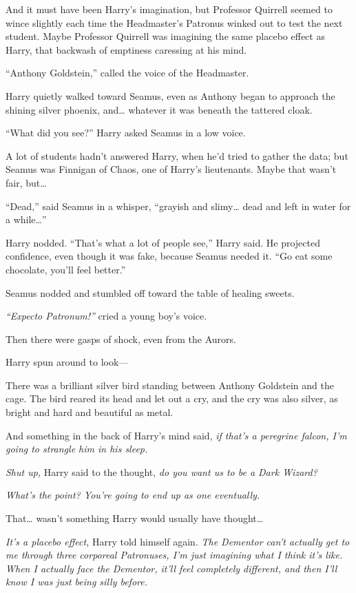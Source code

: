 And it must have been Harry's imagination, but Professor Quirrell seemed
to wince slightly each time the Headmaster's Patronus winked out to test
the next student. Maybe Professor Quirrell was imagining the same
placebo effect as Harry, that backwash of emptiness caressing at his
mind.

``Anthony Goldstein,'' called the voice of the Headmaster.

Harry quietly walked toward Seamus, even as Anthony began to approach
the shining silver phoenix, and\ldots{} whatever it was beneath the
tattered cloak.

``What did you see?'' Harry asked Seamus in a low voice.

A lot of students hadn't answered Harry, when he'd tried to gather the
data; but Seamus was Finnigan of Chaos, one of Harry's lieutenants.
Maybe that wasn't fair, but\ldots{}

``Dead,'' said Seamus in a whisper, ``grayish and slimy\ldots{} dead and
left in water for a while\ldots{}''

Harry nodded. ``That's what a lot of people see,'' Harry said. He
projected confidence, even though it was fake, because Seamus needed it.
``Go eat some chocolate, you'll feel better.''

Seamus nodded and stumbled off toward the table of healing sweets.

\emph{``Expecto Patronum!''} cried a young boy's voice.

Then there were gasps of shock, even from the Aurors.

Harry spun around to look---

There was a brilliant silver bird standing between Anthony Goldstein and
the cage. The bird reared its head and let out a cry, and the cry was
also silver, as bright and hard and beautiful as metal.

And something in the back of Harry's mind said, \emph{if that's a
peregrine falcon, I'm going to strangle him in his sleep.}

\emph{Shut up,} Harry said to the thought, \emph{do you want us to be a
Dark Wizard?}

\emph{What's the point? You're going to end up as one eventually.}

That\ldots{} wasn't something Harry would usually have thought\ldots{}

\emph{It's a placebo effect,} Harry told himself again. \emph{The
Dementor can't actually get to me through three corporeal Patronuses,
I'm just imagining what I think it's like. When I actually face the
Dementor, it'll feel completely different, and then I'll know I was just
being silly before.}

